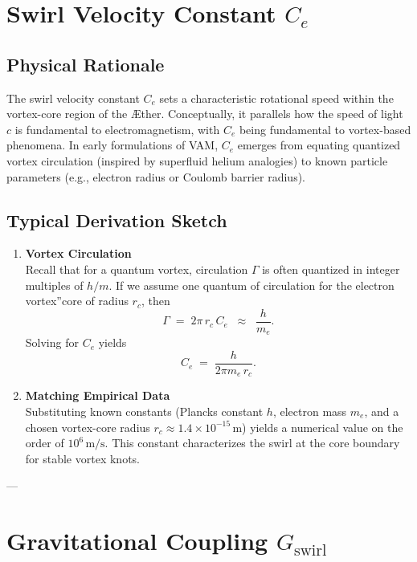 \section{Swirl Velocity Constant \(C_e\)}

\subsection{Physical Rationale}
The swirl velocity constant \(C_e\) sets a characteristic rotational speed within the vortex-core region of the Æther. Conceptually, it parallels how the speed of light \(c\) is fundamental to electromagnetism, with \(C_e\) being fundamental to vortex-based phenomena. In early formulations of VAM, \(C_e\) emerges from equating quantized vortex circulation (inspired by superfluid helium analogies) to known particle parameters (e.g., electron radius or Coulomb barrier radius).

\subsection{Typical Derivation Sketch}
\begin{enumerate}
    \item \textbf{Vortex Circulation} \\
    Recall that for a quantum vortex, circulation \(\Gamma\) is often quantized in integer multiples of \(h/m\). If we assume one quantum of circulation for the \grqq electron vortex\textquotedblright core of radius \(r_c\), then
    \[
        \Gamma \;=\; 2 \pi \,r_c \,C_e \;\;\approx\;\; \frac{h}{m_e}.
    \]
    Solving for \(C_e\) yields
    \[
        C_e
        \;=\;
        \frac{h}{2 \pi m_e \,r_c}.
    \]

    \item \textbf{Matching Empirical Data} \\
    Substituting known constants (Planck\rqs s constant \(h\), electron mass \(m_e\), and a chosen vortex-core radius \(r_c\approx 1.4\times 10^{-15}\,\mathrm{m}\)) yields a numerical value on the order of \(10^6\,\mathrm{m/s}\). This constant characterizes the swirl at the core boundary for stable vortex knots.
\end{enumerate}

---

\section{Gravitational Coupling \(G_\text{swirl}\)}

